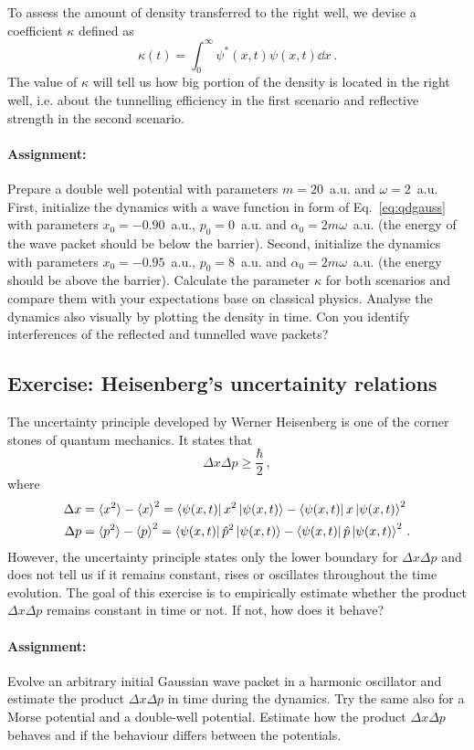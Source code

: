 To assess the amount of density transferred to the right well, we devise a coefficient $\kappa$ defined as
\begin{equation*}
    \kappa(t) = \int_0^{\infty} \psi^*(x,t) \psi(x,t) \dd x \,.
\end{equation*}
The value of $\kappa$ will tell us how big portion of the density is located in the right well, i.e. about the tunnelling efficiency in the first scenario and reflective strength in the second scenario.

\paragraph{Assignment:} Prepare a double well potential with parameters $m=20$~a.u. and $\omega=2$~a.u. First, initialize the dynamics with a wave function in form of Eq.~\eqref{eq:qdgauss} with parameters $x_0=-0.90$~a.u., $p_0=0$~a.u. and $\alpha_0 = 2m\omega$~a.u. (the energy of the wave packet should be below the barrier). Second, initialize the dynamics with parameters $x_0=-0.95$~a.u., $p_0=8$~a.u. and $\alpha_0=2m\omega$~a.u. (the energy should be above the barrier). Calculate the parameter $\kappa$ for both scenarios and compare them with your expectations base on classical physics. Analyse the dynamics also visually by plotting the density in time. Con you identify interferences of the reflected and tunnelled wave packets?

\subsection*{Exercise: Heisenberg's uncertainity relations}

The uncertainty principle developed by Werner Heisenberg is one of the corner stones of quantum mechanics. It states that
\begin{equation*}
    \Delta x \Delta p \ge \frac{\hbar}{2} \, , 
\end{equation*}
where
\begin{align*}
    \Delta x &= \braket{x^2} - \braket{x}^2 = \bra{\psi(x, t)}x^2\ket{\psi(x,t)} -  \bra{\psi(x, t)}x\ket{\psi(x,t)}^2\\
    \Delta p &= \braket{p^2} - \braket{p}^2 = \bra{\psi(x, t)}\hat{p}^2\ket{\psi(x,t)} -  \bra{\psi(x, t)}\hat{p}\ket{\psi(x,t)}^2 \, .
\end{align*}
However, the uncertainty principle states only the lower boundary for $\Delta x \Delta p$ and does not tell us if it remains constant, rises or oscillates throughout the time evolution. The goal of this exercise is to empirically estimate whether the product $ \Delta x \Delta p$ remains constant in time or not. If not, how does it behave?

\paragraph{Assignment:} Evolve an arbitrary initial Gaussian wave packet in a harmonic oscillator and estimate the product $\Delta x \Delta p$ in time during the dynamics. Try the same also for a Morse potential and a double-well potential. Estimate how the product $\Delta x \Delta p$ behaves and if the behaviour differs between the potentials.